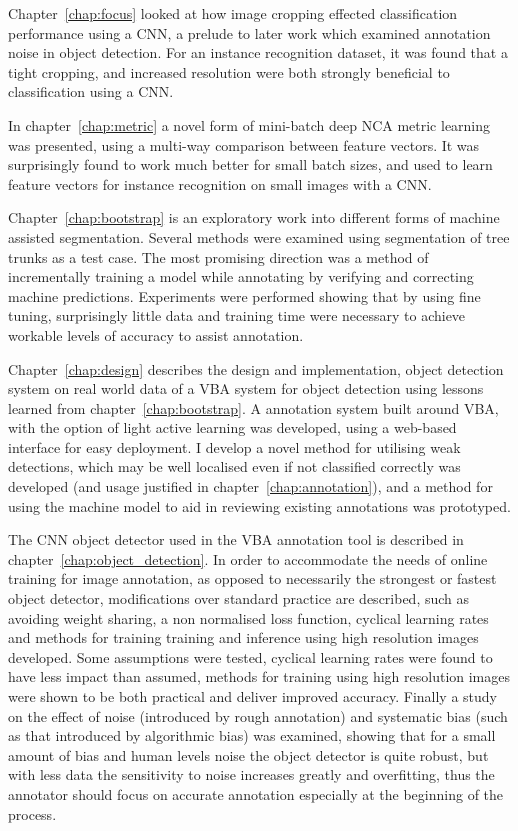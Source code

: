 Chapter~\ref{chap:focus} looked at how image cropping effected classification performance using a \gls{CNN}, a prelude to later work which examined annotation noise in object detection. For an instance recognition dataset, it was found that a tight cropping, and increased resolution were both strongly beneficial to classification using a \gls{CNN}.

In chapter~\ref{chap:metric} a novel form of mini-batch deep \gls{NCA} metric learning was presented, using a multi-way comparison between feature vectors. It was surprisingly found to work much better for small batch sizes, and used to learn feature vectors for instance recognition on small images with a \gls{CNN}.

Chapter~\ref{chap:bootstrap} is an exploratory work into different forms of machine assisted segmentation. Several methods were examined using segmentation of tree trunks as a test case. The most promising direction was a method of incrementally training a model while annotating by verifying and correcting machine predictions. Experiments were performed showing that by using fine tuning, surprisingly little data and training time were necessary to achieve workable levels of accuracy to assist annotation. 

Chapter~\ref{chap:design} describes the design and implementation, object detection system on real world data  of a \gls{VBA} system for object detection using lessons learned from chapter~\ref{chap:bootstrap}. A annotation system built around \gls{VBA}, with the option of light active learning was developed, using a web-based interface for easy deployment. I develop a novel method for utilising weak detections, which may be well localised even if not classified correctly was developed (and usage justified in chapter~\ref{chap:annotation}), and a method for using the machine model to aid in reviewing existing annotations was prototyped.

The \gls{CNN} object detector used in the \gls{VBA} annotation tool is described in chapter~\ref{chap:object_detection}. In order to accommodate the needs of online training for image annotation, as opposed to necessarily the strongest or fastest object detector, modifications over standard practice are described, such as avoiding weight sharing, a non normalised loss function, cyclical learning rates and methods for training training and inference using high resolution images developed. Some assumptions were tested, cyclical learning rates were found to have less impact than assumed, methods for training using high resolution images were shown to be both practical and deliver improved accuracy. Finally a study on the effect of noise (introduced by rough annotation) and systematic bias (such as that introduced by algorithmic bias) was examined, showing that for a small amount of bias and human levels noise the object detector is quite robust, but with less data the sensitivity to noise increases greatly and overfitting, thus the annotator should focus on accurate annotation especially at the beginning of the process. 

